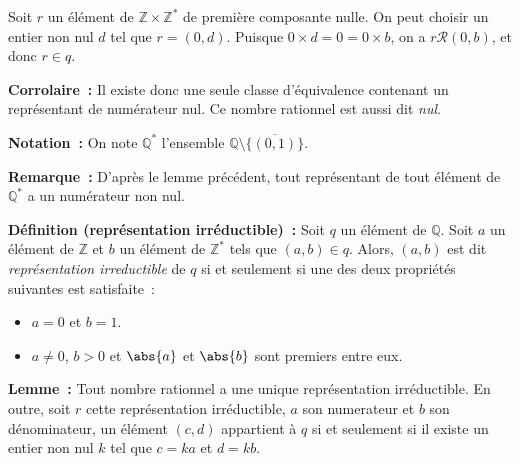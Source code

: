     Soit $r$ un élément de $\mathbb{Z} \times \mathbb{Z}^*$ de première composante nulle.
    On peut choisir un entier non nul $d$ tel que $r = (0, d)$.
    Puisque $0 \times d = 0 = 0 \times b$, on a $r \mathrel{\mathcal{R}} (0, b)$, et donc $r \in q$.

    \done

\medskip

\noindent\textbf{Corrolaire :} Il existe donc une seule classe d'équivalence contenant un représentant de numérateur nul. 
Ce nombre rationnel est aussi dit \emph{nul}.

\medskip

\noindent\textbf{Notation :} On note $\mathbb{Q}^*$ l'ensemble $\mathbb{Q} \setminus \big\lbrace \overline{(0,1)} \big\rbrace$.

\medskip

\noindent\textbf{Remarque :} D'après le lemme précédent, tout représentant de tout élément de $\mathbb{Q}^*$ a un numérateur non nul.

\medskip

\noindent\textbf{Définition (représentation irréductible) :} 
    Soit $q$ un élément de $\mathbb{Q}$. 
    Soit $a$ un élément de $\mathbb{Z}$ et $b$ un élément de $\mathbb{Z}^*$ tels que $(a, b) \in q$.
    Alors, $(a, b)$ est dit \textit{représentation irreductible} de $q$ si et seulement si une des deux propriétés suivantes est satisfaite : 
    \begin{itemize}[nosep]
        \item $a = 0$ et $b = 1$.
        \item $a \neq 0$, $b > 0$ et $\abs{a}$ et $\abs{b}$ sont premiers entre eux.
    \end{itemize}

\medskip

\noindent\textbf{Lemme :} Tout nombre rationnel a une unique représentation irréductible. 
    En outre, soit $r$ cette représentation irréductible, $a$ son numerateur et $b$ son dénominateur, un élément $(c, d)$ appartient à $q$ si et seulement si il existe un entier non nul $k$ tel que $c = k a$ et $d = k b$.

\medskip


